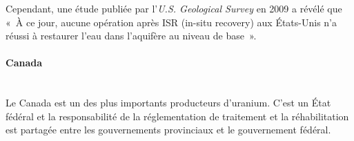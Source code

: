 \documentclass{article}
\begin{document}
Cependant, une étude publiée par l'\textit{U.S. Geological Survey} en 2009 a révélé que «~À ce jour, aucune opération après ISR (in-situ recovery) aux États-Unis n'a réussi à restaurer l'eau dans l'aquifère au niveau de base~».







\paragraph{Canada \\ \\}

Le Canada est un des plus importants producteurs d'uranium. C'est un État fédéral et la responsabilité de la réglementation de traitement et la réhabilitation est partagée entre les gouvernements provinciaux et le gouvernement fédéral.
\end{document}
